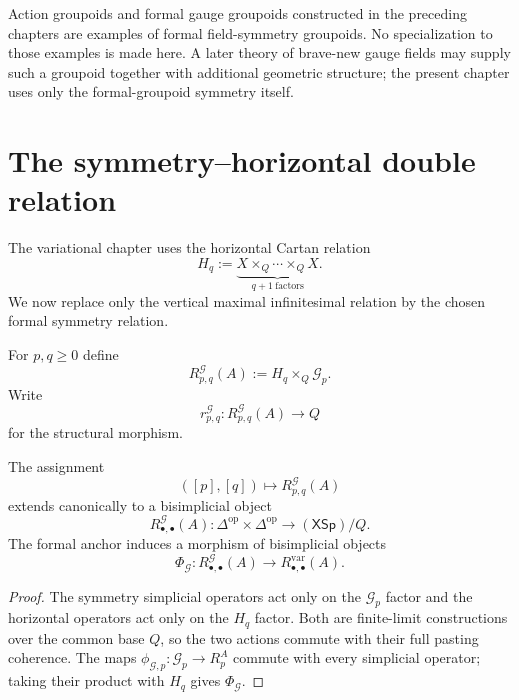 \begin{remark}
\label{rem:symmetry-noether-later-gauge-theoretic-applications}
Action groupoids and formal gauge groupoids constructed in the preceding chapters
are examples of formal field-symmetry groupoids.  No specialization to those
examples is made here.  A later theory of brave-new gauge fields may supply such a
groupoid together with additional geometric structure; the present chapter uses
only the formal-groupoid symmetry itself.
\end{remark}
\section{The symmetry--horizontal double relation}
\label{sec:symmetry-noether-the-symmetry-horizontal-double-relation}

The variational chapter uses the horizontal Cartan relation
\[
H_q
:=
\underbrace{
X\times_Q\cdots\times_Q X
}_{q+1\ \mathrm{factors}}.
\]
We now replace only the vertical maximal infinitesimal relation by the chosen
formal symmetry relation.

\begin{definition}
\label{def:symmetry-noether-symmetry-horizontal-double-relation}
For $p,q\ge0$ define
\[
R^{\mathcal G}_{p,q}(A)
:=
H_q\times_Q\mathcal G_p.
\]
Write
\[
r^{\mathcal G}_{p,q}:
R^{\mathcal G}_{p,q}(A)\longrightarrow Q
\]
for the structural morphism.
\end{definition}

\begin{proposition}
\label{prop:symmetry-noether-bisimplicial-symmetry-horizontal-geometry}
The assignment
\[
([p],[q])
\longmapsto
R^{\mathcal G}_{p,q}(A)
\]
extends canonically to a bisimplicial object
\[
R^{\mathcal G}_{\bullet,\bullet}(A):
\Delta^{\mathrm{op}}\times\Delta^{\mathrm{op}}
\longrightarrow
(\mathsf{XSp})/Q.
\]
The formal anchor induces a morphism of bisimplicial objects
\[
\Phi_{\mathcal G}:
R^{\mathcal G}_{\bullet,\bullet}(A)
\longrightarrow
R^{\mathrm{var}}_{\bullet,\bullet}(A).
\]
\end{proposition}

\begin{proof}
The symmetry simplicial operators act only on the $\mathcal G_p$ factor and the
horizontal operators act only on the $H_q$ factor.  Both are finite-limit
constructions over the common base $Q$, so the two actions commute with their full
pasting coherence.  The maps
$\phi_{\mathcal G,p}:\mathcal G_p\to R^A_p$ commute with every simplicial operator;
taking their product with $H_q$ gives $\Phi_{\mathcal G}$.
\end{proof}

